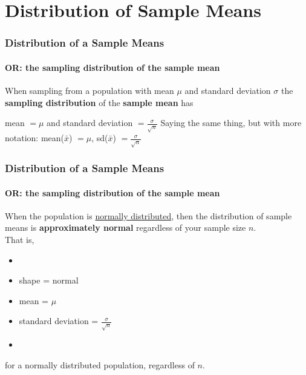 \section[Distribution of $\bar{x}$]{Distribution of Sample Means}
\begin{frame}
\end{frame}

\begin{frame}
\frametitle{Distribution of a Sample Means}
\framesubtitle{OR: the sampling distribution of the sample mean}
When sampling from a population with mean $\mu$ and standard deviation $\sigma$ the \textbf{sampling distribution} of the \textbf{sample mean} has
\begin{center}
mean $ =\mu$  and standard deviation $\displaystyle =\frac{\sigma}{\sqrt{n}}$
\vskip50pt
Saying the same thing, but with more notation:
\vskip10pt
mean($\bar{x}$) $ =\mu$, sd($\bar{x}$) $\displaystyle =\frac{\sigma}{\sqrt{n}}$
\end{center}
\end{frame}

\begin{frame}
\frametitle{Distribution of a Sample Means}
\framesubtitle{OR: the sampling distribution of the sample mean}
When the population is \underline{normally distributed}, then the distribution of sample means is \textbf{approximately normal} regardless of your sample size $n$. \\
\vskip10pt
That is,
\begin{itemize}
\item[]
\item shape = normal
\item mean = $\mu$
\item standard deviation = $\displaystyle\frac{\sigma}{\sqrt{n}}$
\item[]
\end{itemize}
for a normally distributed population, regardless of $n$.
\end{frame}

